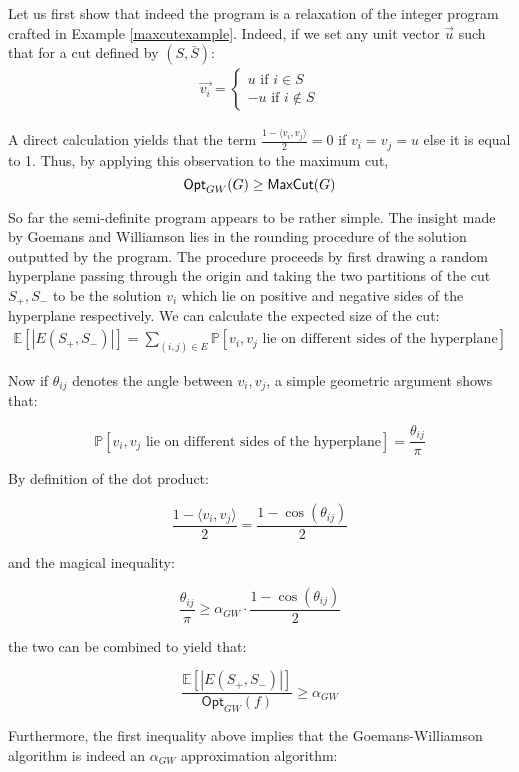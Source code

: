 Let us first show that indeed the program is a relaxation of the integer program crafted in Example \ref{maxcutexample}. Indeed, if we set any unit vector $\vec{u}$ such that for a cut defined by $(S,\bar{S})$:
%
\begin{align*}
  \vec{v_i} = \begin{cases}
                u \text{ if } i \in S \\
                -u \text{ if } i \not\in S
              \end{cases}
\end{align*}

A direct calculation yields that the term $\frac{1 - \langle v_i, v_j \rangle}{2} = 0$ if $v_i = v_j = u$ else it is equal to 1. Thus, by applying this observation to the maximum cut,
%
 \[\mathsf{Opt}_{GW}(G) \geq \mathsf{MaxCut}(G)\]

So far the semi-definite program appears to be rather simple. The insight made by Goemans and Williamson lies in the rounding procedure of the solution outputted by the program. The procedure proceeds by first drawing a random hyperplane passing through the origin and taking the two partitions of the cut $S_+, S_-$ to be the solution $v_i$ which lie on positive and negative sides of the hyperplane respectively. We can calculate the expected size of the cut:
%
\begin{align*}
\mathbb{E}[|E(S_+,S_-)|] = \sum_{(i,j) \in E} \mathbb{P}[v_i,v_j \text{ lie on different sides of the hyperplane}]
\end{align*}

Now if $\theta_{ij}$ denotes the angle between $v_i,v_j$, a simple geometric argument shows that:

\[\mathbb{P}[v_i,v_j \text{ lie on different sides of the hyperplane}] = \frac{\theta_{ij}}{\pi} \]

By definition of the dot product:

\[\frac{1 - \langle v_i, v_j \rangle}{2} =  \frac{1 - \cos(\theta_{ij})}{2} \]

and the magical inequality:

\[ \frac{\theta_{ij}}{\pi} \geq \alpha_{GW} \cdot \frac{1 - \cos(\theta_{ij})}{2}\]

the two can be combined to yield that:

\begin{equation}
  \frac{\mathbb{E}[|E(S_+,S_-)|]}{\mathsf{Opt}_{GW}(f)} \geq \alpha_{GW}
\end{equation}

Furthermore, the first inequality above implies that the Goemans-Williamson algorithm is indeed an $\alpha_{GW}$ approximation algorithm:

